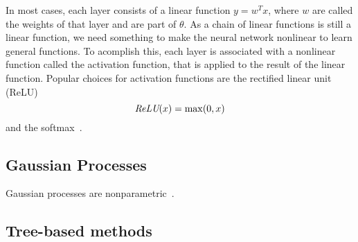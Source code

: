 In most cases, each layer consists of a linear function $y=w^T x$, where $w$
are called the weights of that layer and are part of $\theta$. As a chain of
linear functions is still a linear function, we need something to make the
neural network nonlinear to learn general functions. To acomplish this, each
layer is associated with a nonlinear function called the activation function,
that is applied to the result of the linear function. Popular choices for
activation functions are the rectified linear unit (ReLU)
\begin{equation}
    \operatorname{\textit{ReLU}}(x)=\max(0, x)
\end{equation}
and the softmax~\cite{Goodfellow-et-al-2016}. %

\subsection{Gaussian Processes}%
\label{sub:gaussian_processes}

Gaussian processes are nonparametric~\cite{barberBRML2012}.

\subsection{Tree-based methods}%
\label{sub:tree_based_methods}
